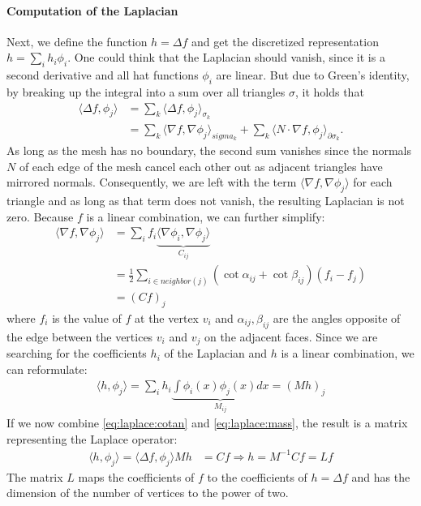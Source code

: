 \paragraph{Computation of the Laplacian}
Next, we define the function $h = \Delta f$ and get the discretized representation $h = \sum_i h_i \phi_i$.
One could think that the Laplacian should vanish, since it is a second derivative and all hat functions $\phi_i$ are linear.
But due to Green's identity, by breaking up the integral into a sum over all triangles $\sigma$, it holds that
\begin{align}
	\langle \Delta f, \phi_j \rangle &= \sum_{k} \langle \Delta f, \phi_j \rangle_{\sigma_k} \\
	&= \sum_{k} \langle \nabla f, \nabla \phi_j \rangle_{sigma_k} + \sum_{k} \langle N \cdot \nabla f, \phi_j \rangle_{\partial \sigma_k}.
\end{align}
As long as the mesh has no boundary, the second sum vanishes since the normals $N$ of each edge of the mesh cancel each other out as adjacent triangles have mirrored normals.
Consequently, we are left with the term $\langle \nabla f, \nabla \phi_j \rangle$ for each triangle and as long as that term does not vanish, the resulting Laplacian is not zero.
Because $f$ is a linear combination, we can further simplify:
\begin{align}
	\langle \nabla f, \nabla \phi_j \rangle &= \sum_i f_i \underbrace{\langle \nabla \phi_i, \nabla \phi_j \rangle}_{C_{ij}} \\
	& = \frac{1}{2} \sum_{i \in neighbor(j)} (\cot \alpha_{ij} + \cot \beta_{ij})(f_i - f_j)\\
	& = (Cf)_j
	\label{eq:laplace:cotan}
\end{align}
where $f_i$ is the value of $f$ at the vertex $v_i$ and $\alpha_{ij},\beta_{ij}$ are the angles opposite of the edge between the vertices $v_i$ and $v_j$ on the adjacent faces.
Since we are searching for the coefficients $h_i$ of the Laplacian and $h$ is a linear combination, we can reformulate:
\begin{align}
	\langle h, \phi_j \rangle = \sum_i h_i \underbrace{\int \phi_i(x) \phi_j(x) dx}_{M_{ij}} = (Mh)_j
	\label{eq:laplace:mass}
\end{align}
If we now combine \eqref{eq:laplace:cotan} and \eqref{eq:laplace:mass}, the result is a matrix representing the Laplace operator:
\begin{align}
	\langle h, \phi_j \rangle = \langle \Delta f, \phi_j \rangle
	Mh &= Cf \Rightarrow h = M^{-1}Cf = Lf
	\label{eq:laplace:final}
\end{align}
The matrix $L$ maps the coefficients of $f$ to the coefficients of $h = \Delta f$ and has the dimension of the number of vertices to the power of two.

